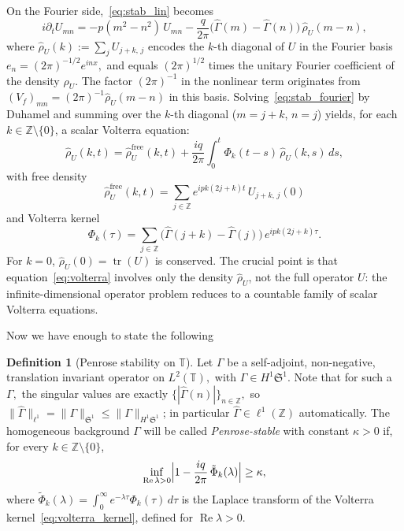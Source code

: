 \documentclass[11pt]{amsart}
\theoremstyle{definition}
\newtheorem{definition}[theorem]{Definition}
\newcommand{\T}{\mathbb{T}}
\newcommand{\Z}{\mathbb{Z}}
\newcommand{\Sp}{\mathfrak{S}}
\DeclareMathOperator{\tr}{tr}
\begin{document}
On the Fourier side,~\eqref{eq:stab_lin} becomes
\begin{equation}\label{eq:stab_fourier}
  i\partial_t U_{mn}
  = -p(m^2-n^2)\,U_{mn}
  - \frac{q}{2\pi}\bigl(\hat\Gamma(m)
  -\hat\Gamma(n)\bigr)\,
  \hat\rho_U(m{-}n),
\end{equation}
where $\hat\rho_U(k) :=\sum_j U_{j+k,\,j}$ encodes the $k$-th diagonal of $U$ in the Fourier basis $e_n=(2\pi)^{-1/2}e^{inx},$ and equals $(2\pi)^{1/2}$ times the unitary Fourier coefficient of the density $\rho_U.$ The factor $(2\pi)^{-1}$ in the nonlinear term originates from $(V_f)_{mn}=(2\pi)^{-1}\hat\rho_U(m-n)$ in this basis. Solving~\eqref{eq:stab_fourier} by Duhamel and summing over the $k$-th diagonal ($m=j+k$, $n=j$) yields, for each $k\in\Z\setminus\{0\}$, a scalar Volterra equation:
\begin{equation}\label{eq:volterra}
  \hat\rho_U(k,t)
  = \hat\rho_U^{\mathrm{free}}(k,t)
  + \frac{iq}{2\pi}\int_0^t\Phi_k(t{-}s)\,
  \hat\rho_U(k,s)\,ds,
\end{equation}
with free density
\begin{equation}\label{eq:free_density}
  \hat\rho_U^{\mathrm{free}}(k,t)
  = \sum_{j\in\Z}
  e^{ipk(2j+k)t}\,U_{j+k,\,j}(0)
\end{equation}
and Volterra kernel
\begin{equation}\label{eq:volterra_kernel}
  \Phi_k(\tau)
  = \sum_{j\in\Z}
  \bigl(\hat\Gamma(j{+}k)
  -\hat\Gamma(j)\bigr)\,
  e^{ipk(2j+k)\tau}.
\end{equation}
For $k=0$, $\hat\rho_U(0)=\tr(U)$ is conserved. The crucial point is that equation~\eqref{eq:volterra} involves only the density $\hat\rho_U$, not the full operator $U$: the infinite-dimensional operator problem reduces to a countable family of scalar Volterra equations.

Now we have enough to state the following
\begin{definition}[Penrose stability
on $\T$]\label{def:penrose}
Let $\Gamma$ be a self-adjoint, non-negative, translation invariant operator on $L^2(\mathbb{T}),$ with $\Gamma\in H^1\Sp^1.$ Note that for such a $\Gamma,$ the singular values are exactly $\{|\hat\Gamma(n)|\}_{n\in\Z},$ so $\|\hat\Gamma\|_{\ell^1}=\|\Gamma\|_{\Sp^1}\le\|\Gamma\|_{H^1\Sp^1}$; in particular $\hat\Gamma\in\ell^1(\Z)$ automatically. The homogeneous background $\Gamma$ will be called \emph{Penrose-stable} with constant $\kappa>0$ if, for every $k\in\Z\setminus\{0\}$,
\begin{equation}\label{eq:penrose}
  \inf_{\operatorname{Re}\lambda> 0}
  \Bigl|1-\frac{iq}{2\pi}\,\tilde\Phi_k(\lambda)\Bigr|
  \ge\kappa,
\end{equation}
where $\tilde\Phi_k(\lambda) =\int_0^\infty e^{-\lambda\tau} \Phi_k(\tau)\,d\tau$ is the Laplace transform of the Volterra kernel~\eqref{eq:volterra_kernel}, defined for $\operatorname{Re}\lambda>0.$
\end{definition}
\end{document}

